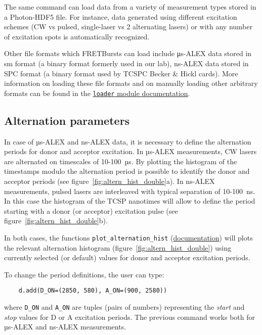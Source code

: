 The same command can load data from a variety of measurement types stored
in a Photon-HDF5 file. For instance, data generated using different excitation schemes
(CW vs pulsed, single-laser vs 2 alternating lasers) or with any number of excitation spots
is automatically recognized.

Other file formats which FRETBursts can load include μs-ALEX data stored in sm format
(a binary format formerly used in our lab),
ns-ALEX data stored in SPC format (a binary format used by TCSPC Becker \& Hickl cards).
More information on loading these file formats and on manually loading other arbitrary formats
can be found in the
\href{http://fretbursts.readthedocs.org/en/latest/loader.html}{\texttt{loader} module documentation}.

\subsection{Alternation parameters}
\label{sec:alternation}

In case of µs-ALEX and ns-ALEX data, it is necessary to define the
alternation periods for donor and acceptor excitation. 
In µs-ALEX measurements, CW lasers are alternated on timescales of 10-100~µs.
By plotting the histogram of the timestamps modulo the alternation period
is possible to identify the donor and acceptor periods (see figure~\ref{fig:altern_hist_double}a).
In ns-ALEX measurements, pulsed lasers are interleaved with typical separation of 10-100~ns.
In this case the histogram of the TCSP nanotimes will allow to define the period
starting with a donor (or acceptor) excitation pulse (see figure~\ref{fig:altern_hist_double}b).

In both cases, the functions
\verb|plot_alternation_hist| (\href{http://fretbursts.readthedocs.org/en/latest/plots.html#fretbursts.burst\_plot.plot\_alternation\_hist}{documentation})
will plots the relevant alternation histogram (figure~\ref{fig:altern_hist_double}) 
using currently selected (or default) values for donor and acceptor excitation periods.

To change the period definitions, the user can type:

\begin{verbatim}
    d.add(D_ON=(2850, 580), A_ON=(900, 2580))
\end{verbatim}

where \verb|D_ON| and \verb|A_ON| are tuples (pairs of numbers) representing
the \textit{start} and \textit{stop} values for D or A excitation periods.
The previous command works both for µs-ALEX and ns-ALEX measurements.

